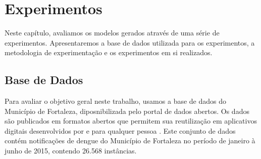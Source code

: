 \documentclass[
	12pt,				%
	openright,			%
	oneside,	
	a4paper,				%
	english,				%
	brazil				%
]{abntex2/abntex2} %
\begin{document}
	
\chapter{Experimentos}

	Neste capítulo, avaliamos os modelos gerados através de uma série de experimentos. Apresentaremos a base de dados utilizada para os experimentos, a metodologia de experimentação e os experimentos em si realizados.

	\section{Base de Dados}
	
	Para avaliar o objetivo geral neste trabalho, usamos a base de dados  do Município de Fortaleza, diposnibilizada pelo portal de dados abertos. Os dados são publicados em formatos abertos que permitem sua reutilização  em aplicativos digitais desenvolvidos por e para qualquer pessoa \cite{fortaleza:2015}. Este conjunto de dados contém notificações de dengue do Município de Fortaleza no período de janeiro à junho de 2015, contendo 26.568 instâncias. %
\end{document}
